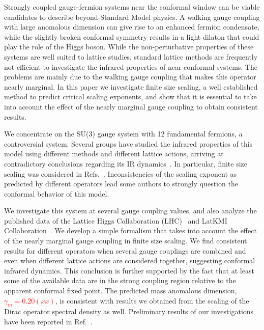 \documentclass[prl, letterpaper, amsmath, amssymb, preprintnumbers, showpacs, superscriptaddress, twocolumn]{revtex4-1}
\newcommand{\ga}{\ensuremath{\gamma} }
\newcommand{\refcite}[1]{Ref.~\cite{#1}}
\newcommand{\TODO}[1]{\textcolor{red}{{\bf #1}}}
\begin{document}
Strongly coupled gauge-fermion systems near the conformal window can be viable candidates to describe beyond-Standard Model physics.
A walking gauge coupling with large anomalous dimension can give rise to an enhanced fermion condensate, while the slightly broken conformal symmetry results in a light dilaton that could play the role of the Higgs boson.
While the non-perturbative properties of these systems are well suited to lattice studies, standard lattice methods are frequently not efficient to investigate the infrared properties of near-conformal systems.
The problems are mainly due to the walking gauge coupling that makes this operator nearly marginal.
In this paper we investigate finite size scaling, a well established method to predict critical scaling exponents, and show that it is essential to take into account the effect of the nearly marginal gauge coupling to obtain consistent results.

We concentrate on the SU(3) gauge system with 12 fundamental fermions, a controversial system.
Several groups have studied the infrared properties of this model using different methods and different lattice actions, arriving at contradictory conclusions regarding its IR dynamics~\cite{Appelquist:2009ty, Deuzeman:2009mh, Hasenfratz:2011xn, Fodor:2011tu, Appelquist:2011dp,DeGrand:2011cu, Cheng:2011ic, Cheng:2013eu, Fodor:2012uw, Fodor:2012et, Aoki:2012eq, Aoki:2013pca, Itou:2012qn, Lin:2012iw, Jin:2012dw}.
In particular, finite size scaling was considered in Refs.~\cite{Fodor:2011tu, Appelquist:2011dp, DeGrand:2011cu, Fodor:2012et, Aoki:2012eq}.
Inconsistencies of the scaling exponent as predicted by different operators lead some authors to strongly question the conformal behavior of this model.

We investigate this system at several gauge coupling values, and also analyze the published data of the Lattice Higgs Collaboration (LHC)~\cite{Fodor:2011tu} and LatKMI Collaboration~\cite{Aoki:2012eq}.
We develop a simple formalism that takes into account the effect of the nearly marginal gauge coupling in finite size scaling.
We find consistent results for different operators when several gauge couplings are combined and even when different lattice actions are considered together, suggesting conformal infrared dynamics.
This conclusion is further supported by the fact that at least some of the available data are in the strong coupling region relative to the apparent conformal fixed point.
The predicted mass anomalous dimension, \TODO{$\ga_m = 0.20(xx)$}, is consistent with results we obtained from the scaling of the Dirac operator spectral density as well.
Preliminary results of our investigations have been reported in \refcite{Hasenfratz:2013eka}.
\end{document}
